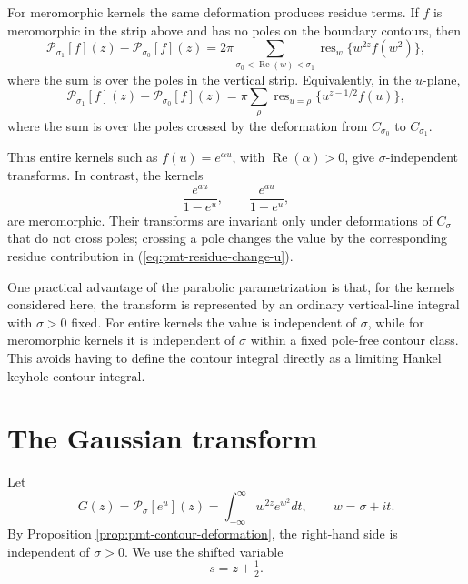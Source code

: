\documentclass[12pt,english]{article}
\theoremstyle{plain} %
\theoremstyle{remark} %
\begin{document}
For meromorphic kernels the same deformation produces residue terms. If $f$ is meromorphic in the strip above and has no poles on the boundary contours, then
$$
\mathcal{P}_{\sigma_1}[f](z)-\mathcal{P}_{\sigma_0}[f](z)
=
2\pi
\sum_{\sigma_0<\operatorname{Re}(w)<\sigma_1}
\operatorname{res}_{w}
\{w^{2z}f(w^2)\},
$$
where the sum is over the poles in the vertical strip. Equivalently, in the $u$-plane,
\begin{equation}
\mathcal{P}_{\sigma_1}[f](z)-\mathcal{P}_{\sigma_0}[f](z)
=
\pi
\sum_{\rho}
\operatorname{res}_{u=\rho}
\{u^{z-1/2}f(u)\},
\label{eq:pmt-residue-change-u}
\end{equation}
where the sum is over the poles crossed by the deformation from $C_{\sigma_0}$ to $C_{\sigma_1}$.

Thus entire kernels such as $f(u)=e^{\alpha u}$, with $\operatorname{Re}(\alpha)>0$, give $\sigma$-independent transforms. In contrast, the kernels
$$
\frac{e^{au}}{1-e^u},
\qquad
\frac{e^{au}}{1+e^u},
$$
are meromorphic. Their transforms are invariant only under deformations of $C_\sigma$ that do not cross poles; crossing a pole changes the value by the corresponding residue contribution in (\ref{eq:pmt-residue-change-u}).

One practical advantage of the parabolic parametrization is that, for the kernels considered here, the transform is represented by an ordinary vertical-line integral with $\sigma>0$ fixed. For entire kernels the value is independent of $\sigma$, while for meromorphic kernels it is independent of $\sigma$ within a fixed pole-free contour class. This avoids having to define the contour integral directly as a limiting Hankel keyhole contour integral.

\section{The Gaussian transform}
\label{sec:gaussian-transform}

Let
\begin{equation}
G(z)=\mathcal{P}_\sigma[e^u](z)
=
\int_{-\infty}^{\infty}w^{2z}e^{w^2}dt,
\qquad w=\sigma+it.
\label{eq:gaussian-pmt}
\end{equation}
By Proposition \ref{prop:pmt-contour-deformation}, the right-hand side is independent of $\sigma>0$. We use the shifted variable
$$
s=z+\tfrac{1}{2}.
$$
\end{document}
